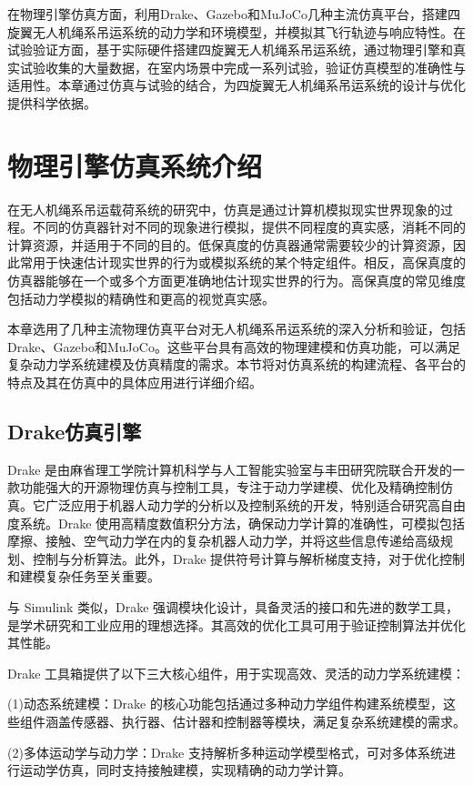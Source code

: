 \documentclass[lang=chs, degree=master, blindreview=false, winfonts=true]{yanputhesis}
\begin{document}
在物理引擎仿真方面，利用Drake、Gazebo和MuJoCo几种主流仿真平台，搭建四旋翼无人机绳系吊运系统的动力学和环境模型，并模拟其飞行轨迹与响应特性。在试验验证方面，基于实际硬件搭建四旋翼无人机绳系吊运系统，通过物理引擎和真实试验收集的大量数据，在室内场景中完成一系列试验，验证仿真模型的准确性与适用性。本章通过仿真与试验的结合，为四旋翼无人机绳系吊运系统的设计与优化提供科学依据。
\section{物理引擎仿真系统介绍}
在无人机绳系吊运载荷系统的研究中，仿真是通过计算机模拟现实世界现象的过程。不同的仿真器针对不同的现象进行模拟，提供不同程度的真实感，消耗不同的计算资源，并适用于不同的目的。低保真度的仿真器通常需要较少的计算资源，因此常用于快速估计现实世界的行为或模拟系统的某个特定组件。相反，高保真度的仿真器能够在一个或多个方面更准确地估计现实世界的行为。高保真度的常见维度包括动力学模拟的精确性和更高的视觉真实感。

本章选用了几种主流物理仿真平台对无人机绳系吊运系统的深入分析和验证，包括Drake、Gazebo和MuJoCo。这些平台具有高效的物理建模和仿真功能，可以满足复杂动力学系统建模及仿真精度的需求。本节将对仿真系统的构建流程、各平台的特点及其在仿真中的具体应用进行详细介绍。



\subsection{Drake仿真引擎}

Drake 是由麻省理工学院计算机科学与人工智能实验室与丰田研究院联合开发的一款功能强大的开源物理仿真与控制工具，专注于动力学建模、优化及精确控制仿真。它广泛应用于机器人动力学的分析以及控制系统的开发，特别适合研究高自由度系统。Drake 使用高精度数值积分方法，确保动力学计算的准确性，可模拟包括摩擦、接触、空气动力学在内的复杂机器人动力学，并将这些信息传递给高级规划、控制与分析算法。此外，Drake 提供符号计算与解析梯度支持，对于优化控制和建模复杂任务至关重要。

与 Simulink 类似，Drake 强调模块化设计，具备灵活的接口和先进的数学工具，是学术研究和工业应用的理想选择。其高效的优化工具可用于验证控制算法并优化其性能。

Drake 工具箱提供了以下三大核心组件，用于实现高效、灵活的动力学系统建模：

(1)动态系统建模：Drake 的核心功能包括通过多种动力学组件构建系统模型，这些组件涵盖传感器、执行器、估计器和控制器等模块，满足复杂系统建模的需求。

(2)多体运动学与动力学：Drake 支持解析多种运动学模型格式，可对多体系统进行运动学仿真，同时支持接触建模，实现精确的动力学计算。
\end{document}
